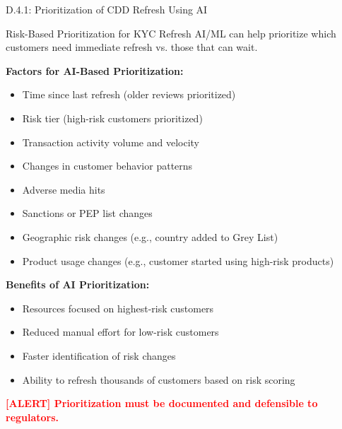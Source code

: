 \documentclass[11pt,a4paper]{beamer}
\newcommand{\redflag}[1]{\textcolor{red}{\textbf{[ALERT] #1}}}
\begin{document}
\begin{frame}{D.4.1: Prioritization of CDD Refresh Using AI}
	\begin{block}{Risk-Based Prioritization for KYC Refresh}
		AI/ML can help prioritize which customers need immediate refresh vs. those that can wait.
	\end{block}
	\textbf{Factors for AI-Based Prioritization:}
	\begin{itemize}
		\item Time since last refresh (older reviews prioritized)
		\item Risk tier (high-risk customers prioritized)
		\item Transaction activity volume and velocity
		\item Changes in customer behavior patterns
		\item Adverse media hits
		\item Sanctions or PEP list changes
		\item Geographic risk changes (e.g., country added to Grey List)
		\item Product usage changes (e.g., customer started using high-risk products)
	\end{itemize}
	\textbf{Benefits of AI Prioritization:}
	\begin{itemize}
		\item Resources focused on highest-risk customers
		\item Reduced manual effort for low-risk customers
		\item Faster identification of risk changes
		\item Ability to refresh thousands of customers based on risk scoring
	\end{itemize}
	\redflag{Prioritization must be documented and defensible to regulators.}
\end{frame}
\end{document}
